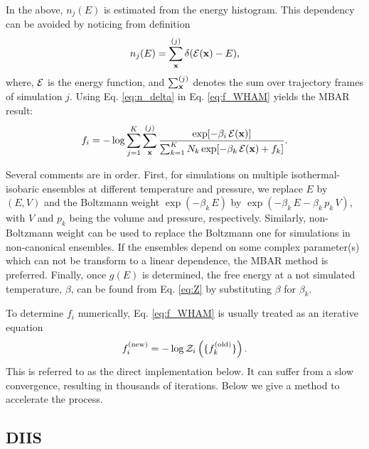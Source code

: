 \documentclass[reprint,superscriptaddress]{revtex4-1}
\begin{document}
In the above,
$n_j(E)$ is estimated from the energy histogram.
%
This dependency can be avoided
by noticing from definition
%
\begin{equation}
n_j(E)
=
\sum_{\mathbf{x}}^{(j)} \delta(\mathcal{E}(\mathbf{x}) - E),
\label{eq:n_delta}
\end{equation}
%
where,
$\mathcal{E}$
is the energy function,
and
$\sum_{\mathbf{x}}^{(j)}$
denotes the sum over trajectory frames
of simulation $j$.
%
%
%
Using Eq. \eqref{eq:n_delta} in Eq. \eqref{eq:f_WHAM} yields
the MBAR\cite{shirts2008} result:
%
\begin{equation}
f_i
=
-\log
\sum_{j = 1}^K
\sum_{\mathbf{x}}^{(j)}
\frac{
  \exp[-\beta_i \, \mathcal{E}(\mathbf{x})]
}
{
  \sum_{k = 1}^K N_k \exp[-\beta_k \, \mathcal{E}(\mathbf{x}) + f_k]
}.
\label{eq:f_MBAR}
\end{equation}
%



Several comments are in order.
%
First,
for simulations on multiple isothermal-isobaric ensembles
at different temperature and pressure,
%
we replace $E$ by $(E, V)$
and the Boltzmann weight
$\exp(-\beta_k \, E)$
by
$\exp(-\beta_k \, E - \beta_k \, p_k \, V)$,
with
$V$ and $p_k$
being the volume and pressure,
respectively.
%
Similarly,
non-Boltzmann weight\cite{
mezei1987, *berg1992, *lee1993, *tsallis1988}
can be used to replace the Boltzmann one
for simulations in non-canonical ensembles.
%
If the ensembles depend on
some complex parameter(s)
which can not be transform to a linear dependence,
the MBAR method is preferred\cite{
shirts2008}.
%
Finally,
once $g(E)$ is determined,
the free energy at a not simulated temperature, $\beta$,
can be found from Eq. \eqref{eq:Z}
by substituting $\beta$ for $\beta_k$.


To determine $f_i$ numerically,
Eq. \eqref{eq:f_WHAM}
is usually treated as an iterative equation
%
\begin{equation}
f_i^\mathrm{(new)}
=
-\log \mathcal{Z}_i\left(
  \{ f_k^\mathrm{(old)} \}
\right).
\end{equation}
%
This is referred to as
the direct implementation below.
%
It can suffer from a slow convergence,
resulting in thousands of iterations\cite{
bereau2009, kim2011}.
%
Below we give a method to accelerate the process.





\subsection{DIIS}
\end{document}
